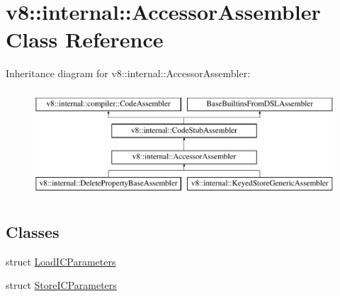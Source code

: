 \hypertarget{classv8_1_1internal_1_1AccessorAssembler}{}\section{v8\+:\+:internal\+:\+:Accessor\+Assembler Class Reference}
\label{classv8_1_1internal_1_1AccessorAssembler}
Inheritance diagram for v8\+:\+:internal\+:\+:Accessor\+Assembler\+:\begin{figure}[H]
\begin{center}
\leavevmode
\includegraphics[height=4.000000cm]{classv8_1_1internal_1_1AccessorAssembler}
\end{center}
\end{figure}
\subsection*{Classes}
\begin{DoxyCompactItemize}
\item 
struct \mbox{\hyperlink{structv8_1_1internal_1_1AccessorAssembler_1_1LoadICParameters}{Load\+I\+C\+Parameters}}
\item 
struct \mbox{\hyperlink{structv8_1_1internal_1_1AccessorAssembler_1_1StoreICParameters}{Store\+I\+C\+Parameters}}
\end{DoxyCompactItemize}
